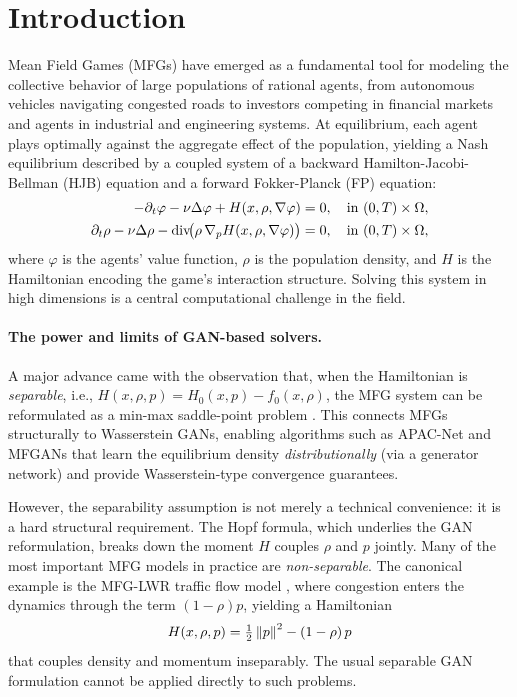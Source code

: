 \section{Introduction}
\label{sec:intro}

Mean Field Games (MFGs) \citep{lasry2007mean, huang2006large} have emerged as
a fundamental tool for modeling the collective behavior of large populations
of rational agents, from autonomous vehicles navigating congested roads
\citep{huang2019mfg} to investors competing in financial markets
\citep{carmona2018probabilistic} and agents in industrial and engineering systems.
At equilibrium, each agent plays optimally against the aggregate effect of the
population, yielding a Nash equilibrium described by a coupled system of
a backward Hamilton-Jacobi-Bellman (HJB) equation and a forward Fokker-Planck
(FP) equation:
\begin{align}
  -\partial_t \varphi - \nu\Delta\varphi + H(x,\rho,\nabla\varphi) &= 0,
  \quad \text{in } (0,T)\times\Omega, \label{eq:HJB}\\
  \partial_t \rho - \nu\Delta\rho - \operatorname{div}\!\bigl(\rho\,\nabla_p H(x,\rho,\nabla\varphi)\bigr)
  &= 0, \quad \text{in } (0,T)\times\Omega, \label{eq:FP}
\end{align}
where $\varphi$ is the agents' value function, $\rho$ is the population density,
and $H$ is the Hamiltonian encoding the game's interaction structure.
Solving this system in high dimensions is a central computational challenge
in the field.

\paragraph{The power and limits of GAN-based solvers.}
A major advance came with the observation that, when the Hamiltonian is
\emph{separable}, i.e., $H(x,\rho,p) = H_0(x,p) - f_0(x,\rho)$,
the MFG system can be reformulated as a min-max saddle-point problem
\citep{cao2021connecting}.
This connects MFGs structurally to Wasserstein GANs, enabling
algorithms such as APAC-Net \citep{lin2021apac} and MFGANs
\citep{ruthotto2020machine} that learn the equilibrium density
\emph{distributionally} (via a generator network) and provide
Wasserstein-type convergence guarantees.

However, the separability assumption is not merely a technical convenience:
it is a hard structural requirement.
The Hopf formula, which underlies the GAN reformulation, breaks down the moment
$H$ couples $\rho$ and $p$ jointly.
Many of the most important MFG models in practice are \emph{non-separable}.
The canonical example is the MFG-LWR traffic flow model \citep{huang2019mfg},
where congestion enters the dynamics through the term $(1-\rho)p$,
yielding a Hamiltonian
\[
  H(x,\rho,p) = \tfrac{1}{2}\left\lVert p \right\rVert^2 - (1-\rho)\,p
\]
that couples density and momentum inseparably.
The usual separable GAN formulation cannot be applied directly to such
problems.


